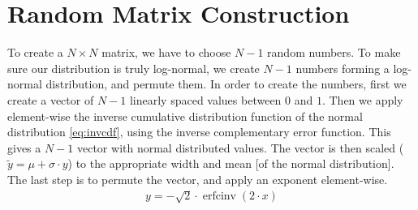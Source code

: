 \documentclass[onecolumn,fleqn]{revtex4}
\begin{document}
\section{Random Matrix Construction}\label{sec:matrix_construction}
To create a $N\times N$ matrix, we have to choose $N-1$ random numbers. To make sure our distribution is truly log-normal, we create $N-1$ numbers forming a log-normal distribution, and permute them. In order to create the numbers, first we create a vector of $N-1$ linearly spaced values between $0$ and $1$. Then we apply element-wise the inverse cumulative distribution function of the normal distribution \ref{eq:invcdf}, using the inverse complementary error function. This gives a $N-1$ vector with normal distributed values. The vector is then scaled ($\tilde{y} = \mu+\sigma\cdot y$) to the appropriate width and mean [of the normal distribution]. The last step is to permute the vector, and apply an exponent element-wise.
\begin{align}\label{eq:invcdf}
y = -\sqrt{2}\cdot\operatorname{erfcinv}(2\cdot x) 
\end{align}


\end{document}
